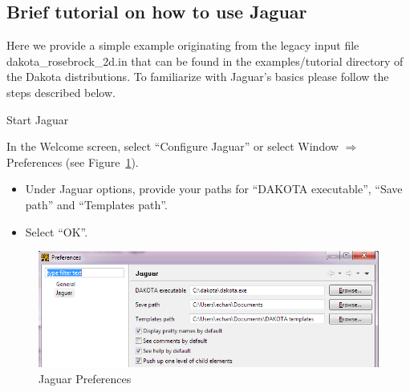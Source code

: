 \newpage
\subsection{Brief tutorial on how to use Jaguar}

Here we provide a simple example originating from the legacy input file dakota\_rosebrock\_2d.in that can be found in the examples/tutorial
directory of the Dakota distributions. To familiarize with Jaguar's basics please follow the steps described below.

Start Jaguar

In the Welcome screen, select ``Configure Jaguar'' or select Window $\Rightarrow$ Preferences (see Figure~\ref{fig:input:0Preferences}).
\begin{itemize}
\item Under Jaguar options, provide your paths for ``DAKOTA executable'', ``Save path'' and ``Templates path''.
\item Select ``OK''.
\end{itemize}
\begin{figure}[htbp]
  \centering
  \includegraphics[scale=0.6]{images/0Preferences}
  \caption{Jaguar Preferences}
  \label{fig:input:0Preferences}
\end{figure}

